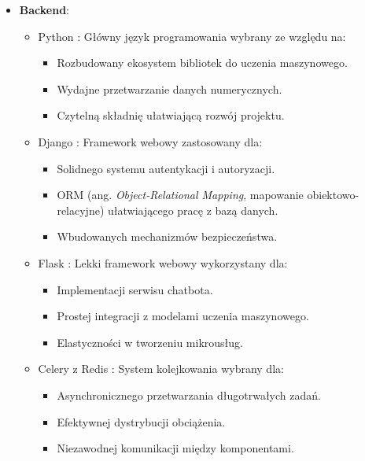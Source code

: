 \documentclass[a4paper,twoside,12pt]{book}
\begin{document}
\begin{itemize}
    \item \textbf{Backend}:
          \begin{itemize}
            \item Python \cite{bib:python}: Główny język programowania wybrany ze względu na:
                  \begin{itemize}
                    \item Rozbudowany ekosystem bibliotek do uczenia maszynowego.
                    \item Wydajne przetwarzanie danych numerycznych.
                    \item Czytelną składnię ułatwiającą rozwój projektu.
                  \end{itemize}
            \item Django \cite{bib:django}: Framework webowy zastosowany dla:
                  \begin{itemize}
                    \item Solidnego systemu autentykacji i autoryzacji.
                    \item ORM (ang. \textit{Object-Relational Mapping}, mapowanie obiektowo-relacyjne) ułatwiającego pracę z bazą danych.
                    \item Wbudowanych mechanizmów bezpieczeństwa.
                  \end{itemize}
            \item Flask \cite{bib:flask}: Lekki framework webowy wykorzystany dla:
                  \begin{itemize}
                    \item Implementacji serwisu chatbota.
                    \item Prostej integracji z modelami uczenia maszynowego.
                    \item Elastyczności w tworzeniu mikrousług.
                  \end{itemize}
            \item Celery \cite{bib:celery} z Redis \cite{bib:redis}: System kolejkowania wybrany dla:
                  \begin{itemize}
                    \item Asynchronicznego przetwarzania długotrwałych zadań.
                    \item Efektywnej dystrybucji obciążenia.
                    \item Niezawodnej komunikacji między komponentami.
                  \end{itemize}
          \end{itemize}
	      

\end{itemize}
\end{document}
